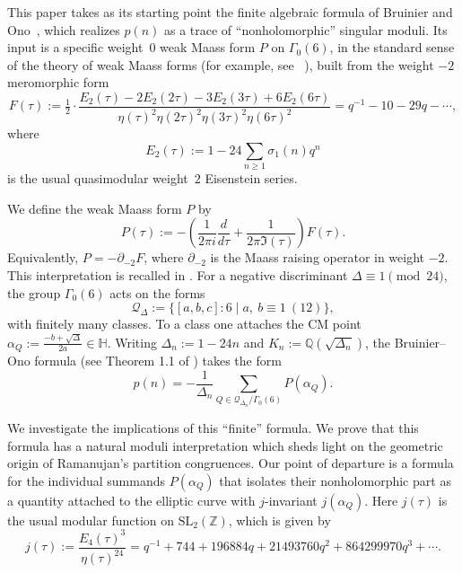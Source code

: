 \documentclass[12pt]{amsart}
\theoremstyle{definition}
\theoremstyle{remark}
\newcommand{\HH}{\mathbb{H}}
\newcommand{\Q}{\mathbb{Q}}
\newcommand{\cQ}{\mathcal{Q}}
\begin{document}
This paper takes as its starting point the finite algebraic formula of Bruinier and
Ono~\cite{BOAIM}, which realizes $p(n)$ as a trace of  ``nonholomorphic'' singular moduli. Its input is a
specific weight~$0$ weak Maass form $P$ on $\Gamma_0(6)$, in the standard sense of the
theory of weak Maass forms (for example, see ~\cite{BFOR}),  built from the weight $-2$
meromorphic form
\[
F(\tau):=\tfrac12\cdot\frac{E_2(\tau)-2E_2(2\tau)-3E_2(3\tau)+6E_2(6\tau)}
{\eta(\tau)^2\eta(2\tau)^2\eta(3\tau)^2\eta(6\tau)^2}=q^{-1}-10-29q-\cdots,
\]
where
\[
E_2(\tau):=1-24\sum_{n\ge1}\sigma_1(n)q^n
\]
is the usual quasimodular weight~$2$ Eisenstein series. 

We define the weak Maass form $P$ by
\begin{equation}\label{eq:P-def-intro}
P(\tau):=-\left(\frac{1}{2\pi i}\frac{d}{d\tau}+\frac{1}{2\pi\Im(\tau)}\right)F(\tau).
\end{equation}
Equivalently, $P=-\partial_{-2}F$, where $\partial_{-2}$ is the Maass raising operator
in weight $-2$. This interpretation is recalled in . For a negative discriminant
$\Delta\equiv1\pmod{24}$, the group $\Gamma_0(6)$ acts on the forms
$$\cQ_\Delta:=\{[a,b,c]:6\mid a,\ b\equiv1\ (12)\},
$$
 with finitely many classes. To a class one
attaches the CM point $\alpha_Q:=\frac{-b+\sqrt\Delta}{2a}\in\HH$. Writing $\Delta_n:=1-24n$
and $K_n:=\Q(\sqrt{\Delta_n})$, the Bruinier--Ono formula (see Theorem 1.1 of \cite{BOAIM}) takes the form
\begin{equation}\label{eq:BO}
p(n)=-\frac{1}{\Delta_n}\sum_{Q\in\cQ_{\Delta_n}/\Gamma_0(6)}P(\alpha_Q).
\end{equation}

We investigate the implications of this ``finite'' formula. We prove that this formula has a natural moduli interpretation which sheds light on the geometric origin of Ramanujan's partition congruences.
Our point of departure is a formula for the individual summands $P(\alpha_Q)$ that isolates
their nonholomorphic part as a quantity attached to the elliptic curve with $j$-invariant
$j(\alpha_Q)$. Here $j(\tau)$ is the usual modular function on $\mathrm{SL}_2(\mathbb{Z})$, which is given by
\[
j(\tau)
:=\frac{E_4(\tau)^3}{\eta(\tau)^{24}}
=q^{-1}+744+196884q+21493760q^2+864299970q^3+\cdots .
\]
\end{document}
